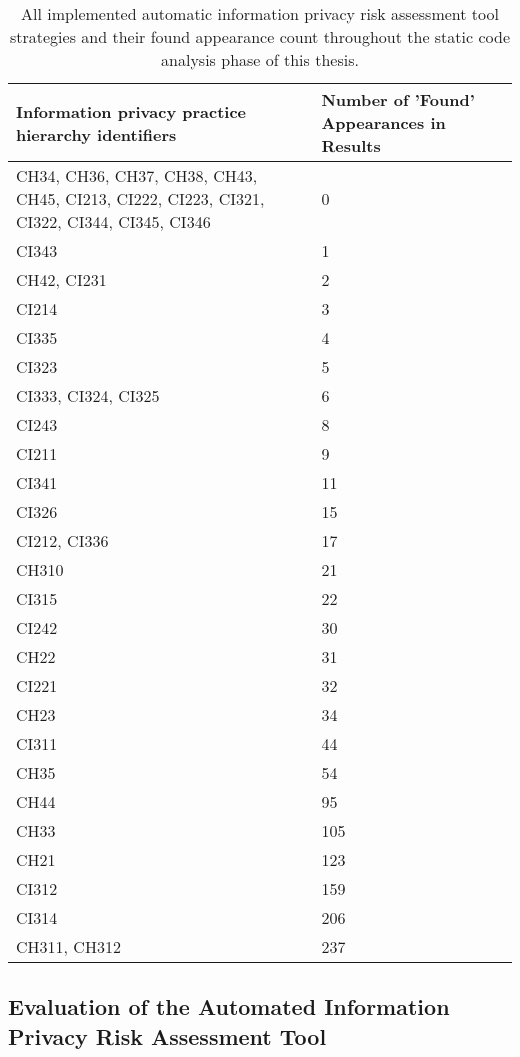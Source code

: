 \begin{table}[]
\centering
\begin{tabular}{|p{8cm}|p{6cm}|}
\hline
\textbf{Information privacy practice hierarchy identifiers}  & \textbf{Number of 'Found' Appearances in Results} \\ \hline
CH34, CH36, CH37, CH38, CH43, CH45, CI213, CI222, CI223, CI321, CI322, CI344, CI345, CI346  & 0   \\ \hline
CI343 & 1   \\ \hline
CH42, CI231  & 2   \\ \hline
CI214 & 3   \\ \hline
CI335 & 4   \\ \hline
CI323 & 5   \\ \hline
CI333, CI324, CI325 & 6   \\ \hline
CI243 & 8   \\ \hline
CI211 & 9   \\ \hline
CI341 & 11  \\ \hline
CI326 & 15  \\ \hline
CI212, CI336 & 17  \\ \hline
CH310 & 21  \\ \hline
CI315 & 22  \\ \hline
CI242 & 30  \\ \hline
CH22  & 31  \\ \hline
CI221 & 32  \\ \hline
CH23  & 34  \\ \hline
CI311 & 44  \\ \hline
CH35  & 54  \\ \hline
CH44  & 95  \\ \hline
CH33  & 105 \\ \hline
CH21  & 123 \\ \hline
CI312 & 159 \\ \hline
CI314 & 206 \\ \hline
CH311, CH312 & 237 \\ \hline
\end{tabular}
\caption{All implemented automatic information privacy risk assessment tool strategies and their found appearance count throughout the static code analysis phase of this thesis.}
\label{table:strategyResults}
\end{table}

\subsection{Evaluation of the Automated Information Privacy Risk Assessment Tool}


